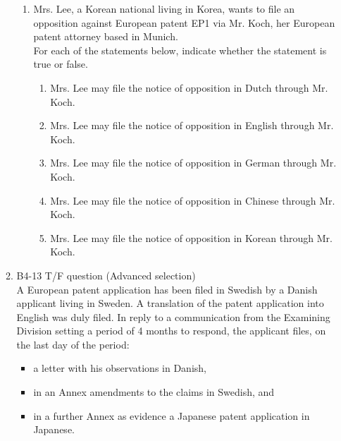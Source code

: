 \documentclass{report}
\begin{document}
\begin{enumerate}[label=\textbf{Question \arabic*}]
\begin{enumerate}[label=\textbf{Question \arabic*}]
\begin{enumerate}[label=(\alph*)]
        \item Mrs. Lee, a Korean national living in Korea, wants to file an opposition against European patent EP1 via Mr. Koch, her European patent attorney based in Munich. \\
        For each of the statements below, indicate whether the statement is true or false.
        \begin{enumerate}[label={(\alph{enumi}.\arabic*)}]
            \item Mrs. Lee may file the notice of opposition in Dutch through Mr. Koch.
            \item Mrs. Lee may file the notice of opposition in English through Mr. Koch.
            \item Mrs. Lee may file the notice of opposition in German through Mr. Koch.
            \item Mrs. Lee may file the notice of opposition in Chinese through Mr. Koch.
            \item Mrs. Lee may file the notice of opposition in Korean through Mr. Koch.
        \end{enumerate}
    \end{enumerate}

    \item %
    B4-13 \quad T/F question (Advanced selection) \\
    A European patent application has been filed in Swedish by a Danish applicant living in Sweden. A translation of the patent application into English was duly filed. In reply to a communication from the Examining Division setting a period of 4 months to respond, the applicant files, on the last day of the period:
    \begin{itemize}
        \item a letter with his observations in Danish,
        \item in an Annex amendments to the claims in Swedish, and 
        \item in a further Annex as evidence a Japanese patent application in Japanese.
    \end{itemize}
    

\end{enumerate}
\end{enumerate}
\end{document}

